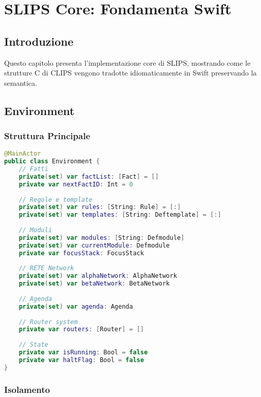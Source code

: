 
\chapter{SLIPS Core: Fondamenta Swift}
\label{cap:slips_core}

\section{Introduzione}

Questo capitolo presenta l'implementazione core di SLIPS, mostrando come le strutture C di CLIPS vengono tradotte idiomaticamente in Swift preservando la semantica.

\section{Environment}

\subsection{Struttura Principale}

\begin{lstlisting}[language=Swift]
@MainActor
public class Environment {
    // Fatti
    private(set) var factList: [Fact] = []
    private var nextFactID: Int = 0
    
    // Regole e template
    private(set) var rules: [String: Rule] = [:]
    private(set) var templates: [String: Deftemplate] = [:]
    
    // Moduli
    private(set) var modules: [String: Defmodule]
    private(set) var currentModule: Defmodule
    private var focusStack: FocusStack
    
    // RETE Network
    private(set) var alphaNetwork: AlphaNetwork
    private(set) var betaNetwork: BetaNetwork
    
    // Agenda
    private(set) var agenda: Agenda
    
    // Router system
    private var routers: [Router] = []
    
    // State
    private var isRunning: Bool = false
    private var haltFlag: Bool = false
}
\end{lstlisting}

\subsection{Isolamento}

